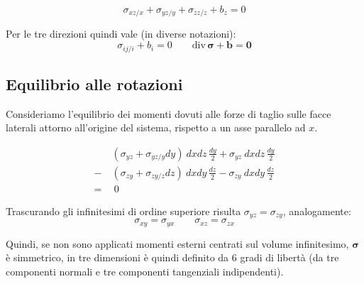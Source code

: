 \begin{equation*}
\sigma_{xz/x}  + \sigma_{yz/y}  + \sigma_{zz/z}  + b_z = 0
\end{equation*}

Per le tre direzioni quindi vale (in diverse notazioni):
\begin{equation*}
\sigma_{ij/i}    + b_i = 0   \quad \quad  \mathrm{div}\, \boldsymbol{\sigma} + \mathbf{b} = \mathbf{0}
\end{equation*}

\subsection*{Equilibrio alle rotazioni}

Consideriamo l'equilibrio dei momenti dovuti alle forze di taglio sulle facce laterali attorno all'origine del sistema, rispetto a un asse parallelo ad $x$.

\begin{align*}
&(\sigma_{yz} + \sigma_{yz/y} dy) \ dx dz\, \frac{dy}{2} + \sigma_{yz}\ dx dz\, \frac{dy}{2}  \\
- \ &(\sigma_{zy} + \sigma_{zy/z} dz)\ dx dy\, \frac{dz}{2} - \sigma_{zy}\ dx dy\, \frac{dz}{2}  \\
  =& \ 0
\end{align*}

Trascurando gli infinitesimi di ordine superiore risulta $\sigma_{yz} = \sigma_{zy}$, analogamente:
\begin{equation*}
\sigma_{xy} = \sigma_{yx}   \quad\quad \sigma_{xz} = \sigma_{zx}
\end{equation*}

Quindi, se non sono applicati momenti esterni centrati sul volume infinitesimo, $\boldsymbol{\sigma}$ è simmetrico, in tre dimensioni è quindi definito da 6 gradi di libertà (da tre componenti normali e tre componenti tangenziali indipendenti).